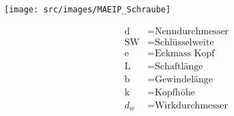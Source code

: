 \begin{scriptsize}
    \begin{minipage}{0.6\linewidth}
        \begin{center}
            \texttt{[image: src/images/MAEIP\_Schraube]}
        \end{center}
    \end{minipage}
    \begin{minipage}{0.38\linewidth}
        \begin{center}
            \begin{align*}
            \text{d} &= \text{Nenndurchmesser}
            \\\text{SW} &= \text{Schlüsselweite}
            \\\text{e} &= \text{Eckmass Kopf}
            \\\text{L} &= \text{Schaftlänge}
            \\\text{b} &= \text{Gewindelänge}
            \\\text{k} &= \text{Kopfhöhe}
            \\d_w &= \text{Wirkdurchmesser}
            \end{align*}
        \end{center}
    \end{minipage}
\end{scriptsize}
\cbreak